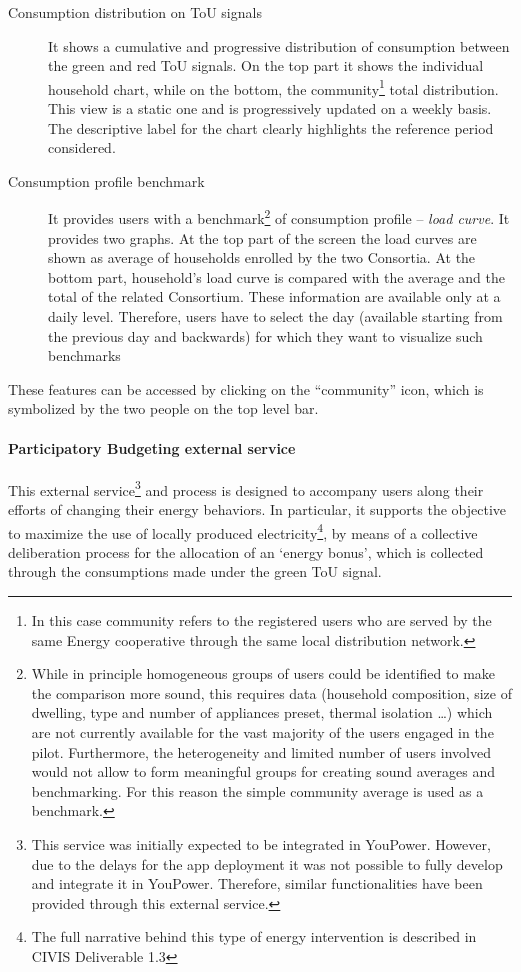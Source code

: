 \begin{description}
 \item[Consumption distribution on ToU signals] It shows a cumulative and progressive distribution of consumption between the green and red ToU signals.
 On the top part it shows the individual household chart, while on the bottom, the community\footnote{In this case community refers to the registered users who 
 are served by the same Energy cooperative through the same local distribution network.} total distribution. This view is a static one and is progressively updated on a weekly basis. The descriptive label for the chart clearly highlights the reference period considered.
 \item[Consumption profile benchmark] It provides users with a benchmark\footnote{While in principle homogeneous groups of users could be identified to make the comparison more sound, this requires data (household composition, size of dwelling, type and number of appliances preset, thermal isolation \ldots) which are not currently available for the vast majority of the users engaged in the pilot.
 Furthermore, the heterogeneity and limited number of users involved would not allow to form meaningful groups for creating sound averages and benchmarking. For this reason the simple community average is used as a benchmark.} of consumption profile -- \textit{load curve}. It provides two graphs. At the top part of the screen the load curves are shown as average of households enrolled by the two Consortia.
 At the bottom part, household's load curve is compared with the average and the total of the related Consortium. These information are available only at a daily level. Therefore, users have to select the day (available starting from the previous day and backwards) for which they want to visualize such benchmarks
\end{description}
These features can be accessed by clicking on the ``community'' icon, which is symbolized by the two people on the top level bar.


\paragraph{Participatory Budgeting external service} 

This external service\footnote{This service was initially expected to be integrated in YouPower. However, due to the delays for the app deployment it was not possible
to fully develop and integrate it in YouPower. Therefore, similar functionalities have been provided through
this external service.} and process is designed to accompany users along their efforts of changing their energy behaviors.
In particular, it supports the objective to maximize the use of locally produced electricity\footnote{The full narrative behind this type of energy intervention
is described in CIVIS Deliverable 1.3}, by means of a collective deliberation process for the allocation of an `energy bonus', which is collected through the consumptions
made under the green ToU signal.

